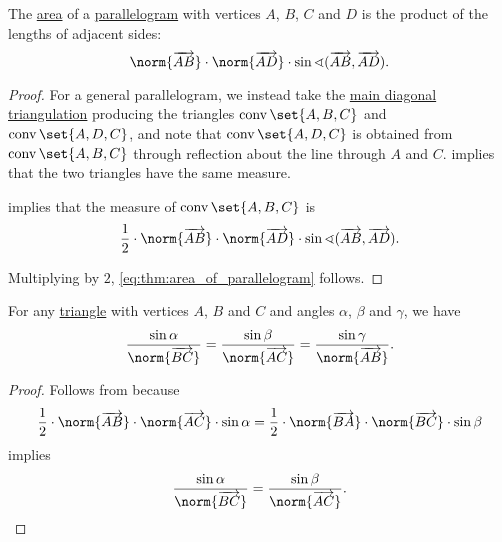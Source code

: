 \begin{proposition}\label{thm:area_of_parallelogram}
  The \hyperref[def:figure_area]{area} of a \hyperref[def:parallelogram]{parallelogram} with vertices \( A \), \( B \), \( C \) and \( D \) is the product of the lengths of adjacent sides:
  \begin{equation}\label{eq:thm:area_of_parallelogram}
    \norm{\vect{AB}} \cdot \norm{\vect{AD}} \cdot \sin\sphericalangle(\vect{AB}, \vect{AD}).
  \end{equation}
\end{proposition}
\begin{proof}
  For a general parallelogram, we instead take the \hyperref[thm__trapezoid_diagonal_triangulation]{main diagonal triangulation} producing the triangles \( \conv\set{ A, B, C } \) and \( \conv\set{ A, D, C } \), and note that \( \conv\set{ A, D, C } \) is obtained from \( \conv\set{ A, B, C } \) through reflection about the line through \( A \) and \( C \).  implies that the two triangles have the same measure.

   implies that the measure of \( \conv\set{ A, B, C } \) is
  \begin{equation*}
    \frac 1 2 \cdot \norm{\vect{AB}} \cdot \norm{\vect{AD}} \cdot \sin\sphericalangle(\vect{AB}, \vect{AD}).
  \end{equation*}

  Multiplying by \( 2 \), \eqref{eq:thm:area_of_parallelogram} follows.
\end{proof}

\begin{theorem}\label{thm:law_of_sines}
  For any \hyperref[def:triangle]{triangle} with vertices \( A \), \( B \) and \( C \) and angles \( \alpha \), \( \beta \) and \( \gamma \), we have
  \begin{equation}\label{eq:thm:law_of_sines}
    \frac {\sin \alpha} {\norm{\vect{BC}}}
    =
    \frac {\sin \beta} {\norm{\vect{AC}}}
    =
    \frac {\sin \gamma} {\norm{\vect{AB}}}.
  \end{equation}
\end{theorem}
\begin{proof}
  Follows from  because
  \begin{equation*}
    \frac 1 2 \cdot \norm{\vect{AB}} \cdot \norm{\vect{AC}} \cdot \sin \alpha
    =
    \frac 1 2 \cdot \norm{\vect{BA}} \cdot \norm{\vect{BC}} \cdot \sin \beta
  \end{equation*}
  implies
  \begin{equation*}
    \frac {\sin \alpha} {\norm{\vect{BC}}}
    =
    \frac {\sin \beta} {\norm{\vect{AC}}}.
  \end{equation*}
\end{proof}

